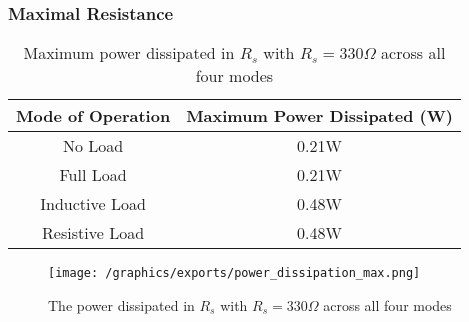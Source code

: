 \subsubsection{Maximal Resistance}
\begin{table}[H]
\centering
\begin{tabular}{|c|c|}\hline
	\textbf{Mode of Operation} & \textbf{Maximum Power Dissipated (W)} \\\hline
	No Load & 0.21W \\
	Full Load &  0.21W \\
	Inductive Load & 0.48W \\
	Resistive Load & 0.48W \\\hline
\end{tabular}
\caption{Maximum power dissipated in $R_s$ with $R_s = 330\Omega$ across all four modes}
\end{table}

\begin{figure}[H]
	\centering
	\texttt{[image: /graphics/exports/power\_dissipation\_max.png]}
	\caption{The power dissipated in $R_s$ with $R_s = 330\Omega$ across all four modes}
\end{figure}